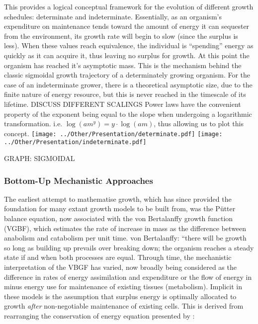 \documentclass[a4paper]{article} %
\begin{document}
        This provides a logical conceptual framework for the evolution of different growth schedules: determinate and indeterminate. Essentially, as an organism's expenditure on maintenance tends toward the amount of energy it can sequester from the environment, its growth rate will begin to slow (since the surplus is less). When these values reach equivalence, the individual is ``spending'' energy as quickly as it can acquire it, thus leaving no surplus for growth. At this point the organism has reached it's asymptotic mass. This is the mechanism behind the classic sigmoidal growth trajectory of a determinately growing organism. For the case of an indeterminate grower, there is a theoretical asymptotic size, due to the finite nature of energy resource, but this is never reached in the timescale of its lifetime. 
        DISCUSS DIFFERENT SCALINGS
        Power laws have the convenient property of the exponent being equal to the slope when undergoing a logarithmic transformation. i.e. $\log{(am^y)} = y\cdot \log{(am)}$, thus allowing us to plot this concept. 
        \texttt{[image: ../Other/Presentation/determinate.pdf]}
        \texttt{[image: ../Other/Presentation/indeterminate.pdf]}

        GRAPH: SIGMOIDAL

        \subsubsection{Bottom-Up Mechanistic Approaches}
            The earliest attempt to mathematise growth, which has since provided the foundation for many extant growth models to be built from, was the P\"{u}tter balance equation, now associated with the von Bertalanffy growth function (VGBF), which estimates the rate of increase in mass as the difference between anabolism and catabolism per unit time. \autocite{Putter1920, vonBert1938, VonBertalanffy1957,Marshall2019b}
            von Bertalanffy: ``there will be growth so long as building up prevails over breaking down; the organism reaches a steady state if and when both processes are equal. Through time, the mechanistic interpretation of the VBGF has varied, now broadly being considered as the difference in rates of energy assimilation and expenditure or the flow of energy in minus energy use for maintenance of existing tissues (metabolism). Implicit in these models is the assumption that surplus energy is optimally allocated to growth \textit{after} non-negotiable maintenance of existing cells. This is derived from rearranging the conservation of energy equation presented by \cite{West2001}:
\end{document}
